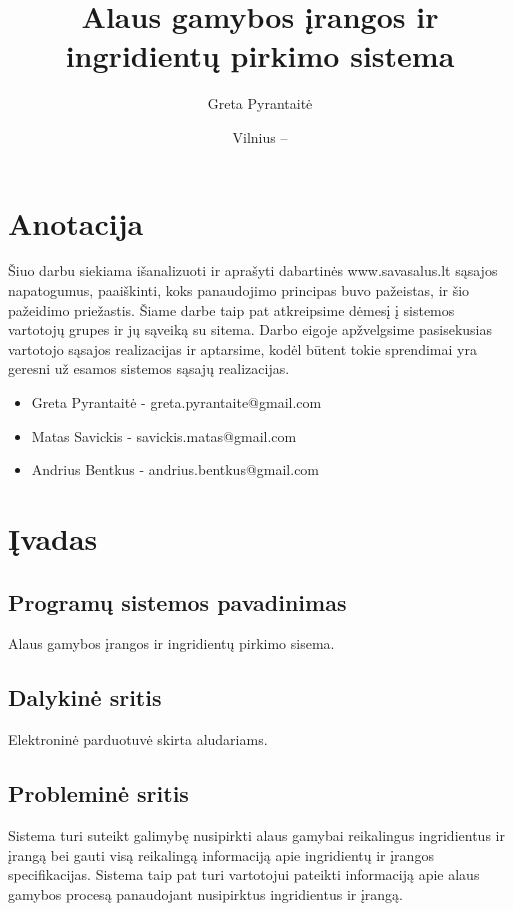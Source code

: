 \documentclass[oneside]{VUMIFPSkursinis}
\title{Alaus gamybos įrangos ir ingridientų pirkimo sistema}
\author{Greta Pyrantaitė}
\date{Vilnius – \the\year}
\begin{document}
\maketitle

\section{Anotacija}
Šiuo darbu siekiama išanalizuoti ir aprašyti dabartinės www.savasalus.lt sąsajos napatogumus, paaiškinti, koks panaudojimo principas buvo pažeistas, ir šio pažeidimo priežastis.
Šiame darbe taip pat atkreipsime dėmesį į sistemos vartotojų grupes ir jų sąveiką su sitema.
Darbo eigoje apžvelgsime pasisekusias vartotojo sąsajos realizacijas ir aptarsime, kodėl būtent tokie sprendimai yra geresni už esamos sistemos sąsajų realizacijas.

\begin{itemize}
	\item{Greta Pyrantaitė - greta.pyrantaite@gmail.com}
	\item{Matas Savickis - savickis.matas@gmail.com}
	\item{Andrius Bentkus - andrius.bentkus@gmail.com}
\end{itemize}

\tableofcontents

\section{Įvadas}
	\subsection{Programų sistemos pavadinimas}
		Alaus gamybos įrangos ir ingridientų pirkimo sisema.
	\subsection{Dalykinė sritis}
		Elektroninė parduotuvė skirta aludariams.
	\subsection{Probleminė sritis}
		Sistema turi suteikt galimybę nusipirkti alaus gamybai reikalingus ingridientus ir įrangą bei gauti visą reikalingą informaciją apie ingridientų ir įrangos specifikacijas.
		Sistema taip pat turi vartotojui pateikti informaciją apie alaus gamybos procesą panaudojant nusipirktus ingridientus ir įrangą.
\end{document}
